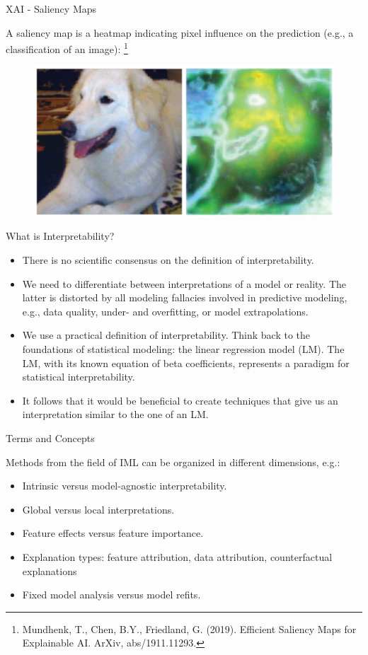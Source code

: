 \documentclass[11pt,compress,t,notes=noshow, aspectratio=169, xcolor=table]{beamer}
\begin{document}
\begin{vbframe}{XAI - Saliency Maps}

A saliency map is a heatmap indicating pixel influence on the prediction (e.g., a classification of an image): \footnote[frame]{Mundhenk, T., Chen, B.Y., Friedland, G. (2019). Efficient Saliency Maps for Explainable AI. ArXiv, abs/1911.11293.
}
\medskip
\begin{figure}
\includegraphics[width = 0.8 \textwidth]{figure/saliencymap}
\end{figure}
\end{vbframe}

\begin{vbframe}{What is Interpretability?}
\begin{itemize}
\itemsep1em
\item There is no scientific consensus on the definition of interpretability.
\item We need to differentiate between interpretations of a model or reality. The latter is distorted by all modeling fallacies involved in predictive modeling, e.g., data quality, under- and overfitting, or model extrapolations. 
\item We use a practical definition of interpretability.
Think back to the foundations of statistical modeling:  the linear regression model (LM). The LM, with its known equation of beta coefficients, represents a paradigm for statistical interpretability.
\item It follows that it would be beneficial to create techniques that give us an interpretation similar to the one of an LM.

\end{itemize}
\end{vbframe}




\begin{vbframe}{Terms and Concepts}

Methods from the field of IML can be organized in different dimensions, e.g.:

	\begin{itemize}
		\itemsep2em
		\item Intrinsic versus model-agnostic interpretability.
        \item Global versus local interpretations.
		\item Feature effects versus feature importance.
		\item Explanation types: feature attribution, data attribution, counterfactual explanations
		\item Fixed model analysis versus model refits.
	\end{itemize}
\end{vbframe}
\end{document}
